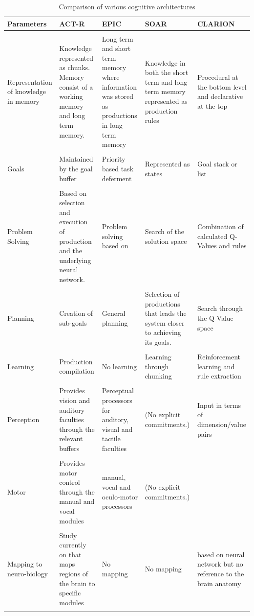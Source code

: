 \begin{landscape}
\begin{table}
  \centering
\caption{Comparison of various cognitive architectures}
\label{tab:architecture-comparison}
  \begin{tabular}{p{3cm}p{4cm}p{4cm}p{4cm}p{4cm}}
  \hline
  Parameters & ACT-R & EPIC & SOAR & CLARION \\
  \hline
  & & & &\\
  Representation of knowledge in memory & Knowledge represented as chunks. Memory consist of a
  working memory and long term memory.& Long term and short term
  memory where information was stored as productions in long term
  memory & Knowledge in both the short term and long term memory
  represented as production rules& Procedural at the bottom level and
  declarative at the top  \\
  & & & &\\
  Goals  & Maintained by the goal buffer & Priority based task
  deferment~\cite{Pew:1998aa}& Represented as states & Goal stack or list \\
  & & & &\\
  Problem Solving  & Based on selection and execution of production
  and the underlying neural network.& Problem solving based on &Search
  of the solution space& Combination of calculated Q-Values and rules\\
  & & & &\\
  Planning  & Creation of sub-goals&General planning & Selection of
  productions that leads the system closer to achieving its
  goals. &Search through the Q-Value space \\
  & & & &\\
  Learning   & Production compilation&No learning & Learning through
  chunking & Reinforcement learning and rule extraction \\
  & & & &\\
  Perception & Provides vision and auditory faculties through the
  relevant buffers& Perceptual processors for auditory, visual and
  tactile faculties & (No explicit commitments.) & Input in terms of dimension/value pairs\\
  & & & &\\
  Motor & Provides motor control through the manual and vocal modules&
  manual, vocal and oculo-motor processors
  & (No explicit commitments.) &\\
  & & & &\\
  Mapping to neuro-biology & Study currently on
  that maps regions of the brain to specific modules& No mapping& No
  mapping& based on neural network but no reference to the brain anatomy\cite{Chong:2007aa} \\
  & & & &\\

\end{tabular}
\end{table}
\end{landscape}

